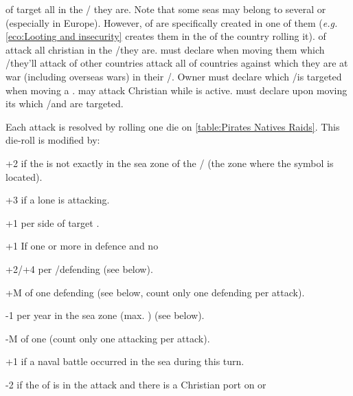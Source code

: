 \bparag \corsaire of  target all \TradeFLEET in the \STZ/\CTZ
they are.
\bparag Note that some seas may belong to several \STZ or \CTZ (especially in
Europe). However, \corsaire of  are specifically created in one
of them (\emph{e.g.} \ref{eco:Looting and insecurity} creates them in the \CTZ
of the country rolling it).
\bparag \corsaire of \Barbaresques attack all christian \TradeFLEET in the
\STZ/\CTZ they are. \TUR must declare when moving them which \STZ/\CTZ they'll
attack
\bparag \corsaire of other countries attack all \TradeFLEET of countries
against which they are at war (including overseas wars) in their
\STZ/\CTZ. Owner must declare which \STZ/\CTZ is targeted when moving a
\corsaire.
\bparag \TUR may attack Christian \TradeFLEET while
 is active. \TUR must declare upon moving its
\corsaire which \CTZ/\STZ and \TradeFLEET are targeted.

\bparag Each attack is resolved by rolling one die on \ref{table:Pirates
  Natives Raids}. This die-roll is modified by:
\begin{modlist}
\item[+2] if the \corsaire is not exactly in the sea zone of the \STZ/\CTZ
  (the zone where the symbol is located).
\item[+3] if a lone \corsaire\facemoins is attacking.
\item[+1] per side of target \TradeFLEET.
\item[+1] If one or more \ND in defence and no \FLEET
\item[+2/+4] per \FLEET\facemoins/\Faceplus defending (see below).
\item[+M] \Man of one defending \LeaderA (see below, count only one defending
  \LeaderA per attack).
\item[-1] per year in the sea zone (max. ) (see below).
\item[-M] \Man of one \corsaire \LeaderA (count only one attacking \LeaderA
  per attack). %
\item[+1] if a naval battle occurred in the sea during this
  turn. %
\item[-2] if the \corsaire of  is in the attack and there is
  a Christian port on  or 
\end{modlist}

